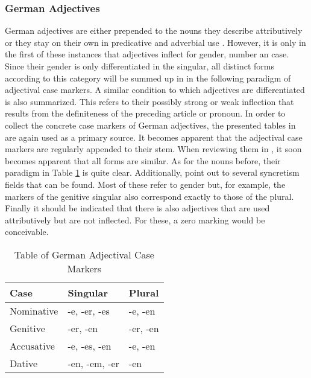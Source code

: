 \documentclass[11pt,a4paper,twoside,openright]{scrbook}
\begin{document}
\subsubsection{German Adjectives}

German adjectives are either prepended to the nouns they describe attributively or they stay on their own in predicative and adverbial use \citep{thieroff2012ger}. However, it is only in the first of these instances that adjectives inflect for gender, number an case. Since their gender is only differentiated in the singular, all distinct forms according to this category will be summed up in in the following paradigm of adjectival case markers. A similar condition to which adjectives are differentiated is also summarized. This refers to their possibly strong or weak inflection that results from the definiteness of the preceding article or pronoun. In order to collect the concrete case markers of German adjectives, the presented tables in \citet{thieroff2012ger} are again used as a primary source. It becomes apparent that the adjectival case markers are regularly appended to their stem.  When reviewing them in \citet{eisenberg2020ger}, it soon becomes apparent that all forms are similar. As for the nouns before, their paradigm in Table \ref{table:german_adjectives} is quite clear. Additionally, \citet{thieroff2012ger} point out to several syncretism fields that can be found. Most of these refer to gender but, for example, the markers of the genitive singular also correspond exactly to those of the plural. Finally it should be indicated that there is also adjectives that are used attributively but are not inflected. For these, a zero marking would be conceivable.

\begin{table}[!htbp]
\centering
\begin{tabular}{|p{}||p{5cm}|p{5cm}|}
 \hline
 Case & Singular & Plural \\ [1ex]
 \hline\hline
 Nominative & -e, -er, -es & -e, -en \\ [1ex]
 \hline
 Genitive & -er, -en & -er, -en \\ [1ex]
 \hline
 Accusative & -e, -es, -en & -e, -en  \\ [1ex]
 \hline
 Dative & -en, -em, -er & -en  \\ [1ex]
 \hline
\end{tabular}
\caption{Table of German Adjectival Case Markers}
\label{table:german_adjectives}
\end{table}
\end{document}
